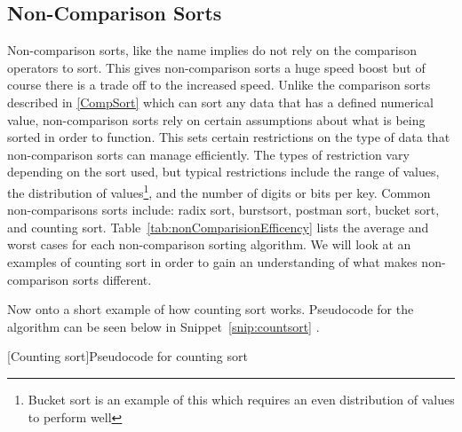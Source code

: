 \documentclass[12pt]{article}
\begin{document}
	
	
	\subsection{Non-Comparison Sorts}
	
	Non-comparison sorts, like the name implies do not rely on the comparison operators to sort\cite[p.~191]{intro}.
	This gives non-comparison sorts a huge speed boost but of course there is a trade off to the increased speed.
	Unlike the comparison sorts described in \ref{CompSort} which can sort any data that has a defined numerical value, non-comparison sorts rely on certain assumptions about what is being sorted in order to function.
	This sets certain restrictions on the type of data that non-comparison sorts can manage efficiently.
	The types of restriction vary depending on the sort used, but typical restrictions include the range of values, the distribution of values\footnote{Bucket sort is an example of this which requires an even distribution of values to perform well}, and the number of digits or bits per key\cite{wiki-sortingAlgorithm}.
	Common non-comparisons sorts include: radix sort, burstsort, postman sort, bucket sort, and counting sort.
	Table~\ref{tab:nonComparisionEfficency} lists the average and worst cases for each non-comparison sorting algorithm.
	We will look at an examples of counting sort in order to gain an understanding of what makes non-comparison sorts different.

	
	Now onto a short example of how counting sort works.
	Pseudocode for the algorithm can be seen below in Snippet~\ref{snip:countsort}
.	\begin{center}
		[Counting sort]{Pseudocode for counting sort\cite[p.~195]{intro}}
		
		\label{snip:countsort}
	\end{center}
	
\end{document}
